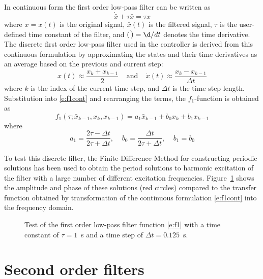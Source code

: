 In continuous form the first order low-pass filter can be written as
\begin{equation}\label{e:f1cont}
\dot{\bar x} + \tau \bar x = \tau x
\end{equation}
where $x=x(t)$ is the original signal, $\bar x(t)$ is the filtered signal, $\tau$ is the user-defined time constant of the filter, and $\dot{(\,)}=\d/dt$ denotes the time derivative. The discrete first order low-pass filter used in the controller is derived from this continuous formulation by approximating the states and their time derivatives as an average based on the previous and current step:
\begin{equation}\label{e:1storder}
x(t)\approx \frac{x_k+x_{k-1}}2 \;\;\;\;\mbox{and} \;\;\;\;\dot x(t)\approx \frac{x_k-x_{k-1}}{\Delta t}
\end{equation}
where $k$ is the index of the current time step, and $\Delta t$ is the time step length. Substitution into \eqref{e:f1cont} and rearranging the terms, the $f_1$-function is obtained as
\begin{equation}
\label{e:f1}
f_1 \left(\tau; \bar x_{k-1} , x_{k} , x_{k-1} \right) = a_1 \bar x_{k-1} + b_0 x_k + b_1 x_{k-1}
\end{equation}
where
\begin{equation}
\label{e:f1coef}
a_1=\frac {2\tau-\Delta t}{2\tau+\Delta t} , \;\;\;\; b_0 = \frac {\Delta t}{2\tau+\Delta t}, \;\;\;\; b_1 = b_0
\end{equation}

To test this discrete filter, the Finite-Difference Method for constructing periodic solutions \cite{Nayfeh95} has been used to obtain the period solutions to harmonic excitation of the filter with a large number of different excitation frequencies. Figure~\ref{f:f1} shows the amplitude and phase of these solutions (red circles) compared to the transfer function obtained by transformation of the continuous formulation \eqref{e:f1cont} into the frequency domain.

\begin{figure}[t]
\centerline{ }
\caption{Test of the first order low-pass filter function \eqref{e:f1} with a time constant of $\tau=1$~s and a time step of $\Delta t = 0.125$~s. \label{f:f1}}
\end{figure}


\section{Second order filters}

